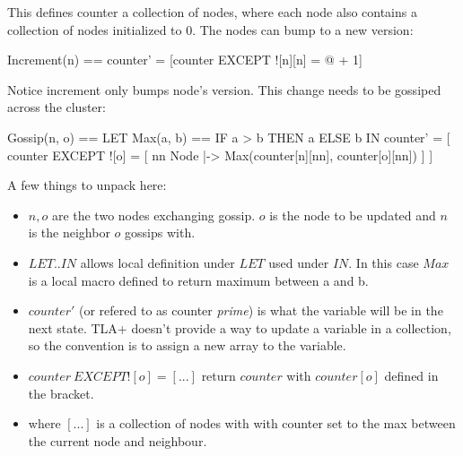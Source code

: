 This defines counter a collection of nodes, where each node also contains a
collection of nodes initialized to 0. The nodes can bump to a new version:\newline
\begin{tla}
    Increment(n) == counter' = [counter EXCEPT ![n][n] = @ + 1]
\end{tla}
\begin{tlatex}
\end{tlatex}
\newline

Notice increment only bumps node's version. This change needs to be gossiped 
across the cluster:\newline
\begin{tla}
Gossip(n, o) ==                  
    LET Max(a, b) == IF a > b THEN a ELSE b 
    IN counter' = [
        counter EXCEPT ![o] = [
            nn \in Node |->            
                Max(counter[n][nn], counter[o][nn])
            ] 
    ]
\end{tla}
\begin{tlatex}
%
\@x{\@s{16.4} \.{\IN} counter \.{'} \.{=} [}%
\@x{\@s{40.89} counter {\EXCEPT} {\bang} [ o ] \.{=} [}%
%
%
\@x{\@s{57.29} ]}%
\@x{\@s{16.4} ]}%
\end{tlatex}
\newline

A few things to unpack here:
\begin{itemize}
    \item $n, o$ are the two nodes exchanging gossip. $o$ is the node to be updated
    and $n$ is the neighbor $o$ gossips with.
    \item $LET .. IN$ allows local definition under $LET$ used under
    $IN$. In this case $Max$ is a local macro defined to return maximum between a and b.
    \item $counter'$ (or refered to as counter \textit{prime}) is what the
    variable will be in the next state. TLA+ doesn't provide a way to update a
    variable in a collection, so the convention is to assign a new array to the variable. 
    \item $counter\ EXCEPT ![o] = [...]$ return $counter$ with $counter[o]$
    defined in the bracket. 
    \item where $[...]$ is a collection of nodes with with counter set to the
    max between the current node and neighbour.
\end{itemize}

